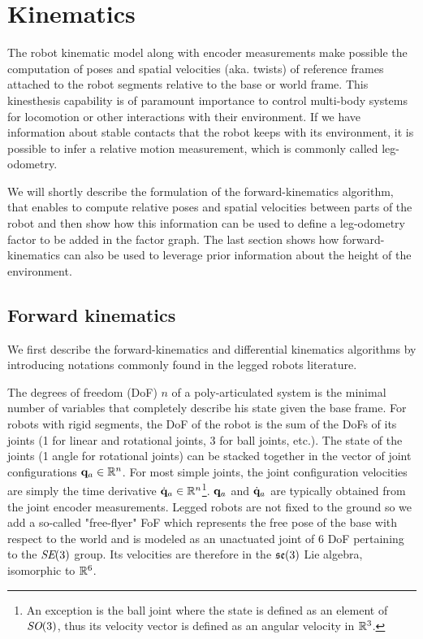 \chapter{Kinematics}
\minitoc
\bigskip

The robot kinematic model along with encoder measurements make possible the computation of poses and spatial velocities \cite{featherstone2014rigid} (aka. twists) 
of reference frames attached to the robot segments relative to the base or world frame. This kinesthesis capability is of paramount importance to control
multi-body systems for locomotion or other interactions with their environment. If we have information about stable contacts that the robot keeps with
its environment, it is possible to infer a relative motion measurement, which is commonly called leg-odometry.

We will shortly describe the formulation of the forward-kinematics algorithm, that enables to compute relative poses and spatial velocities between parts of the robot
and then show how this information can be used to define a leg-odometry factor to be added in the factor graph. The last section shows how forward-kinematics can also be used to leverage prior 
information about the height of the environment. 



\section{Forward kinematics}
\label{sec:forward_kinematics}
We first describe the forward-kinematics and differential kinematics algorithms by introducing notations commonly found in the legged robots literature.

The degrees of freedom (DoF) $n$ of a poly-articulated system is the minimal number of variables that completely describe his state given the base frame. 
For robots with rigid segments, the DoF of the robot is the sum of the DoFs of its joints (1 for linear and rotational joints, 3 for
ball joints, etc.).
The state of the joints (1 angle for rotational joints) can be stacked together in the vector of joint configurations 
${\bf q}_a \in \mathbb{R}^n$. For most simple joints, the joint configuration velocities are simply the time derivative $\dot{{\bf q}}_a \in \mathbb{R}^n$\footnote{An exception is the ball joint where the 
state is defined as an element of $\textit{SO}(3)$, thus its velocity vector is defined as an angular velocity in $\mathbb{R}^3$.}. ${\bf q}_a$ and $\dot{{\bf q}}_a$ are typically obtained from
the joint encoder measurements.
Legged robots are not fixed to the ground so we add a so-called "free-flyer" FoF which represents the free pose of the base with respect to the world and is modeled as an 
unactuated joint of 6 DoF pertaining to the $\textit{SE}(3)$ group. Its velocities are therefore in the ${\mathfrak {se}}(3)$  Lie algebra, isomorphic to $\mathbb{R}^6$. 

